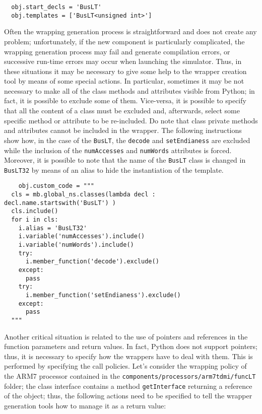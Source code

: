 \scriptsize
\begin{verbatim}
  obj.start_decls = 'BusLT'
  obj.templates = ['BusLT<unsigned int>']
\end{verbatim}
\normalsize

\indent Often the wrapping generation process is straightforward and does not create any problem; unfortunately, if the new component is particularly complicated, the wrapping generation process may fail and generate compilation errors, or successive run-time errors may occur when launching the simulator. Thus, in these situations it may be necessary to give some help to the wrapper creation tool by means of some special actions. In particular, sometimes it may be not necessary to make all of the class methods and attributes visible from Python; in fact, it is possible to exclude some of them. Vice-versa, it is possible to specify that all the content of a class must be excluded and, afterwards, select some specific method or attribute to be re-included. Do note that class private methods and attributes cannot be included in the wrapper. The following instructions show how, in the case of the \texttt{BusLT}, the \texttt{decode} and \texttt{setEndianess} are excluded while the inclusion of the \texttt{numAccesses} and \texttt{numWords} attributes is forced. Moreover, it is possible to note that the name of the \texttt{BusLT} class is changed in \texttt{BusLT32} by means of an alias to hide the instantiation of the template.

\scriptsize
\begin{verbatim}
    obj.custom_code = """
  cls = mb.global_ns.classes(lambda decl : decl.name.startswith('BusLT') )
  cls.include()
  for i in cls:
    i.alias = 'BusLT32'
    i.variable('numAccesses').include()
    i.variable('numWords').include()
    try:
      i.member_function('decode').exclude()
    except:
      pass
    try:
      i.member_function('setEndianess').exclude()
    except:
      pass
  """
\end{verbatim}
\normalsize

\indent Another critical situation is related to the use of pointers and references in the function parameters and return values. In fact, Python does not support pointers; thus, it is necessary to specify how the wrappers have to deal with them. This is performed by specifying the call policies. Let's consider the wrapping policy of the ARM7 processor contained in the \texttt{components/\linebreak processors/arm7tdmi/funcLT} folder; the class interface contains a method \texttt{getInterface} returning a reference of the object; thus, the following actions need to be specified to tell the wrapper generation tools how to manage it as a return value:

